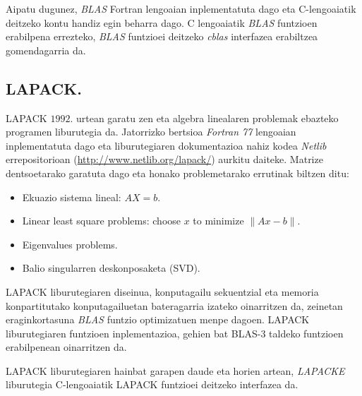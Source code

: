 Aipatu dugunez, \emph{BLAS} Fortran lengoaian inplementatuta dago eta C-lengoaiatik deitzeko kontu handiz egin beharra dago. C lengoaiatik \emph{BLAS} funtzioen erabilpena errezteko, \emph{BLAS} funtzioei deitzeko \emph{cblas} interfazea erabiltzea gomendagarria da. 
   

\subsection*{LAPACK.}

LAPACK $1992.$ urtean garatu zen \cite{Higham2002} eta algebra linealaren problemak ebazteko programen liburutegia da. Jatorrizko bertsioa \emph{Fortran 77} lengoaian inplementatuta dago eta liburutegiaren dokumentazioa nahiz kodea \emph{Netlib} errepositorioan (\url{http://www.netlib.org/lapack/}) aurkitu daiteke. Matrize dentsoetarako garatuta dago eta honako problemetarako errutinak biltzen ditu: 
\begin{itemize}
\item Ekuazio sistema lineal: $AX=b$.
\item Linear least square problems: choose $x$ to minimize $\|Ax-b\|$.
\item Eigenvalues problems.
\item Balio singularren deskonposaketa (SVD).
\end{itemize}

LAPACK liburutegiaren diseinua, konputagailu sekuentzial eta memoria konpartitutako konputagailuetan bateragarria izateko oinarritzen da, zeinetan eraginkortasuna \emph{BLAS} funtzio optimizatuen menpe dagoen. LAPACK liburutegiaren funtzioen inplementazioa, gehien bat BLAS-3 taldeko funtzioen erabilpenean oinarritzen da. 

LAPACK liburutegiaren hainbat garapen daude eta horien artean, \emph{LAPACKE} liburutegia C-lengoaiatik LAPACK funtzioei deitzeko interfazea da. 

